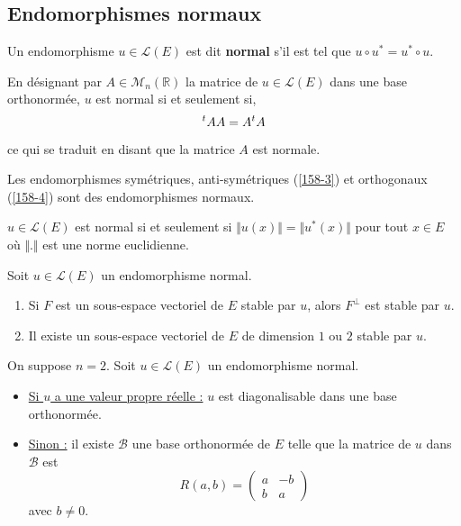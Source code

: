   \subsection{Endomorphismes normaux}


  \begin{definition}
    Un endomorphisme $u \in \mathcal{L}(E)$ est dit \textbf{normal} s'il est tel que $u \circ u^* = u^* \circ u$.
  \end{definition}

  \begin{remark}
    En désignant par $A \in \mathcal{M}_n(\mathbb{R})$ la matrice de $u \in \mathcal{L}(E)$ dans une base orthonormée, $u$ est normal si et seulement si,
    \[ \mathstrut ^t A A = A \mathstrut ^t A \]
    ce qui se traduit en disant que la matrice $A$ est normale.
  \end{remark}

  \begin{example}
    Les endomorphismes symétriques, anti-symétriques (\cref{158-3}) et orthogonaux (\cref{158-4}) sont des endomorphismes normaux.
  \end{example}


  \begin{proposition}
    $u \in \mathcal{L}(E)$ est normal si et seulement si $\Vert u (x) \Vert = \Vert u^* (x) \Vert$ pour tout $x \in E$ où $\Vert . \Vert$ est une norme euclidienne.
  \end{proposition}


  \begin{proposition}
    Soit $u \in \mathcal{L}(E)$ un endomorphisme normal.
    \begin{enumerate}[label={\bfseries(\roman*)}]
      \item Si $F$ est un sous-espace vectoriel de $E$ stable par $u$, alors $F^\perp$ est stable par $u$.
      \item Il existe un sous-espace vectoriel de $E$ de dimension $1$ ou $2$ stable par $u$.
    \end{enumerate}
  \end{proposition}

  \begin{proposition}[Réduction dans le cas $n = 2$]
    \label{158-2}
    On suppose $n = 2$. Soit $u \in \mathcal{L}(E)$ un endomorphisme normal.
    \begin{itemize}
      \item \uline{Si $u$ a une valeur propre réelle :} $u$ est diagonalisable dans une base orthonormée.
      \item \uline{Sinon :} il existe $\mathcal{B}$ une base orthonormée de $E$ telle que la matrice de $u$ dans $\mathcal{B}$ est
      \[ R(a,b) = \begin{pmatrix} a & -b \\ b & a \end{pmatrix} \]
      avec $b \neq 0$.
    \end{itemize}
  \end{proposition}

